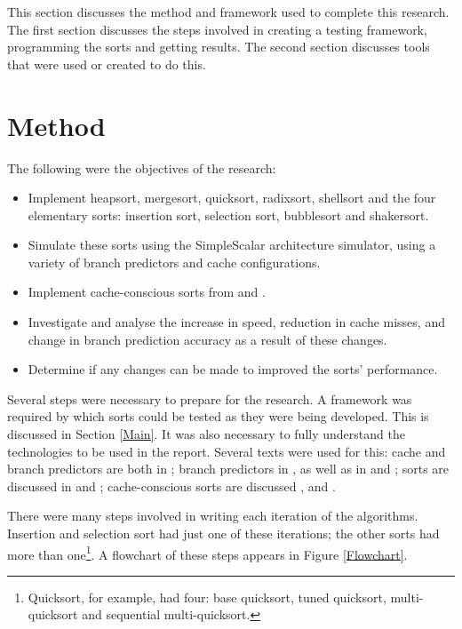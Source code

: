 \label{method}
This section discusses the method and framework used to complete this research.
The first section discusses the steps involved in creating a testing framework,
programming the sorts and getting results. The second section discusses tools
that were used or created to do this.

\section{Method}

The following were the objectives of the research:
\begin{itemize}
\item Implement heapsort, mergesort, quicksort, radixsort, shellsort and the four
elementary sorts: insertion sort, selection sort, bubblesort and shakersort.
\item Simulate these sorts using the SimpleScalar architecture simulator, using a
variety of branch predictors and cache configurations.
\item Implement cache-conscious sorts from \cite{LaMarca96} and
\cite{LaMarca99}.
\item Investigate and analyse the increase in speed, reduction in cache misses, 
and change in branch prediction accuracy as a result of these changes.
\item Determine if any changes can be made to improved the sorts' performance.
\end{itemize}

Several steps were necessary to prepare for the research.  A framework was
required by which sorts could be tested as they were being developed. This is
discussed in Section \ref{Main}. It was also necessary to fully understand the
technologies to be used in the report. Several texts were used for this: cache
and branch predictors are both in \cite{HennessyPatterson90}; branch predictors
in \cite{Uht97}, as well as in \cite{McFarling93} and \cite{Smith81}; sorts are
discussed in \cite{Sedgewick02} and \cite{Knuth98}; cache-conscious sorts are
discussed \cite{LaMarca96}, \cite{LaMarca99} and \cite{LaMarcaHeap96}.

There were many steps involved in writing each iteration of the algorithms.
Insertion and selection sort had just one of these iterations; the other
sorts had more than one\footnote{Quicksort, for example, had four: base
quicksort, tuned quicksort, multi-quicksort and sequential multi-quicksort.}. A
flowchart of these steps appears in Figure \vref{Flowchart}.

